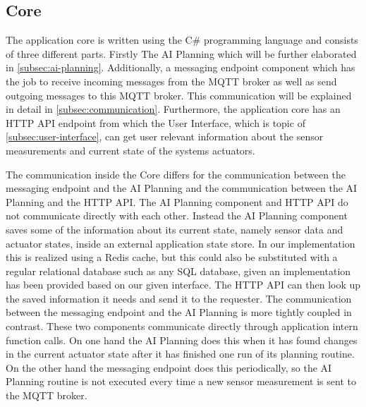 \subsection{Core}\label{subsec:core}

The application core is written using the C\# programming language and consists of three different parts.
Firstly The AI Planning which will be further elaborated in \cref{subsec:ai-planning}.
Additionally, a messaging endpoint component which has the job to receive incoming messages from the MQTT broker as well as send outgoing messages to this MQTT broker.
This communication will be explained in detail in \cref{subsec:communication}.
Furthermore, the application core has an HTTP API endpoint from which the User Interface, which is topic of \cref{subsec:user-interface}, can get user relevant information about the sensor measurements and current state of the systems actuators.

The communication inside the Core differs for the communication between the messaging endpoint and the AI Planning and the communication between the AI Planning and the HTTP API.
The AI Planning component and HTTP API do not communicate directly with each other.
Instead the AI Planning component saves some of the information about its current state, namely sensor data and actuator states, inside an external application state store.
In our implementation this is realized using a Redis cache, but this could also be substituted with a regular relational database such as any SQL database, given an implementation has been provided based on our given interface.
The HTTP API can then look up the saved information it needs and send it to the requester.
The communication between the messaging endpoint and the AI Planning is more tightly coupled in contrast.
These two components communicate directly through application intern function calls.
On one hand the AI Planning does this when it has found changes in the current actuator state after it has finished one run of its planning routine.
On the other hand the messaging endpoint does this periodically, so the AI Planning routine is not executed every time a new sensor measurement is sent to the MQTT broker.
